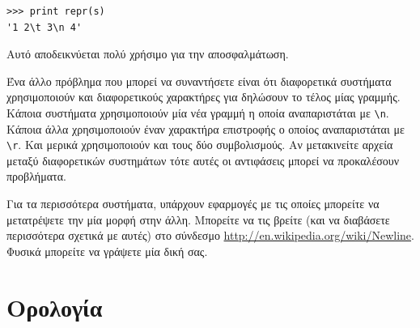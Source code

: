 \documentclass[10pt]{book}
\begin{document}
\begin{verbatim}
>>> print repr(s)
'1 2\t 3\n 4'
\end{verbatim}

Αυτό αποδεικνύεται πολύ χρήσιμο για την αποσφαλμάτωση.

Ένα άλλο πρόβλημα που μπορεί να συναντήσετε είναι ότι διαφορετικά συστήματα χρησιμοποιούν και διαφορετικούς
χαρακτήρες για δηλώσουν το τέλος μίας γραμμής. Κάποια συστήματα χρησιμοποιούν μία νέα γραμμή η οποία αναπαριστάται
με \verb"\n". Κάποια άλλα χρησιμοποιούν έναν χαρακτήρα επιστροφής ο οποίος αναπαριστάται με \verb"\r". Και
μερικά χρησιμοποιούν και τους δύο συμβολισμούς. Αν μετακινείτε αρχεία μεταξύ διαφορετικών συστημάτων τότε αυτές
οι αντιφάσεις μπορεί να προκαλέσουν προβλήματα.

Για τα περισσότερα συστήματα, υπάρχουν εφαρμογές με τις οποίες μπορείτε να μετατρέψετε την μία μορφή στην άλλη. Μπορείτε να τις βρείτε (και να διαβάσετε περισσότερα σχετικά με αυτές) στο σύνδεσμο  \url{http://en.wikipedia.org/wiki/Newline}. Φυσικά μπορείτε να γράψετε μία δική σας. 


\section{Ορολογία}
\end{document}
